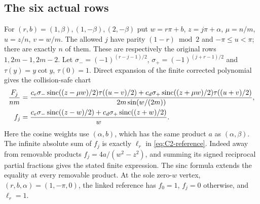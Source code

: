 \subsection{The six actual rows}

For $(r,b)=(1,\beta),(1,-\beta),(2,-\beta)$ put
$w=r\pi+b$, $z=j\pi+\alpha$, $\mu=n/m$, $u=z/n$, $v=w/m$.
The allowed $j$ have parity $(1-r)\bmod2$ and $-\pi\leq u<\pi$;
there are exactly $n$ of them. These are respectively the original rows
$1,2m-1,2m-2$. Let
$\sigma_-=(-1)^{(r-j-1)/2}$, $\sigma_+=(-1)^{(j+r-1)/2}$ and
$\tau(y)=y\cot y$, $\tau(0)=1$. Direct expansion of the finite
corrected polynomial gives the collision-safe chart
\begin{align}\label{eq:finite-sinc-chart}
 \frac{F_j}{nm}
 &=\frac{c_e\sigma_-\operatorname{sinc}((z-\mu w)/2)\tau((u-v)/2)
       +c_d\sigma_+\operatorname{sinc}((z+\mu w)/2)\tau((u+v)/2)}
             {2m\sin(w/(2m))},\\
 f_j&=\frac{c_e\sigma_-\operatorname{sinc}((z-w)/2)
                 +c_d\sigma_+\operatorname{sinc}((z+w)/2)}w.
 \notag
\end{align}
Here the cosine weights use $(\alpha,b)$, which has the same product
$a$ as $(\alpha,\beta)$. The infinite absolute sum of $f_j$ is exactly
$\ell_r$ in \eqref{eq:C2-reference}. Indeed away from removable
products $f_j=4a/(w^2-z^2)$, and summing its signed reciprocal
partial fractions gives the stated finite expression. The sinc
formula extends the equality at every removable product. At the sole
zero-$w$ vertex, $(r,b,\alpha)=(1,-\pi,0)$, the linked reference has
$f_0=1$, $f_j=0$ otherwise, and $\ell_r=1$.

